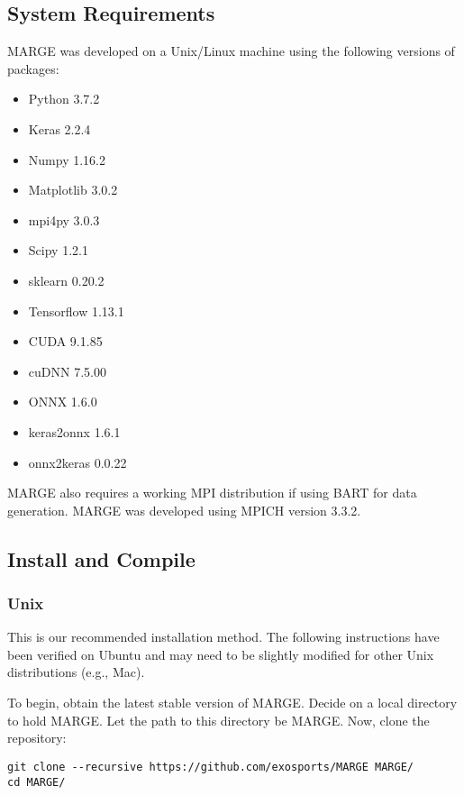 \documentclass[letterpaper, 12pt]{article}
\begin{document}
\subsection{System Requirements}
\label{sec:requirements}

\noindent MARGE was developed on a Unix/Linux machine using the following 
versions of packages:

\begin{itemize}
\item Python 3.7.2
\item Keras 2.2.4
\item Numpy 1.16.2
\item Matplotlib 3.0.2
\item mpi4py 3.0.3
\item Scipy 1.2.1
\item sklearn 0.20.2
\item Tensorflow 1.13.1
\item CUDA 9.1.85
\item cuDNN 7.5.00
\item ONNX 1.6.0
\item keras2onnx 1.6.1
\item onnx2keras 0.0.22
\end{itemize}

\noindent MARGE also requires a working MPI distribution if using BART for 
data generation.  MARGE was developed using MPICH version 3.3.2.



\subsection{Install and Compile}
\label{sec:install}

\subsubsection{Unix}

\noindent This is our recommended installation method.  The following 
instructions have been verified on Ubuntu and may need to be slightly modified 
for other Unix distributions (e.g., Mac).

\noindent To begin, obtain the latest stable version of MARGE.  Decide on a 
local directory to hold MARGE.  Let the path to this directory be 
MARGE. Now, clone the repository:
\begin{verbatim}
git clone --recursive https://github.com/exosports/MARGE MARGE/
cd MARGE/
\end{verbatim}
\newline
\end{document}
